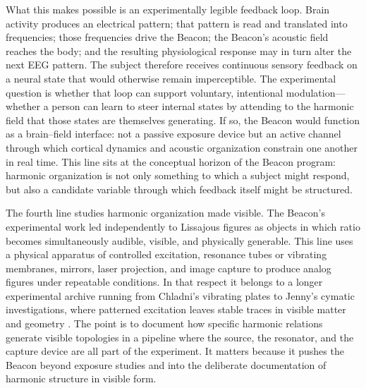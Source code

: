 What this makes possible is an experimentally legible feedback loop. Brain activity produces an electrical pattern; that pattern is read and translated into frequencies; those frequencies drive the Beacon; the Beacon's acoustic field reaches the body; and the resulting physiological response may in turn alter the next EEG pattern. The subject therefore receives continuous sensory feedback on a neural state that would otherwise remain imperceptible. The experimental question is whether that loop can support voluntary, intentional modulation---whether a person can learn to steer internal states by attending to the harmonic field that those states are themselves generating. If so, the Beacon would function as a brain--field interface: not a passive exposure device but an active channel through which cortical dynamics and acoustic organization constrain one another in real time. This line sits at the conceptual horizon of the Beacon program: harmonic organization is not only something to which a subject might respond, but also a candidate variable through which feedback itself might be structured.

The fourth line studies harmonic organization made visible. The Beacon's experimental work led independently to Lissajous figures as objects in which ratio becomes simultaneously audible, visible, and physically generable. This line uses a physical apparatus of controlled excitation, resonance tubes or vibrating membranes, mirrors, laser projection, and image capture to produce analog figures under repeatable conditions. In that respect it belongs to a longer experimental archive running from Chladni's vibrating plates to Jenny's cymatic investigations, where patterned excitation leaves stable traces in visible matter and geometry \parencite{chladni_1787, jenny_1967}. The point is to document how specific harmonic relations generate visible topologies in a pipeline where the source, the resonator, and the capture device are all part of the experiment. It matters because it pushes the Beacon beyond exposure studies and into the deliberate documentation of harmonic structure in visible form.


